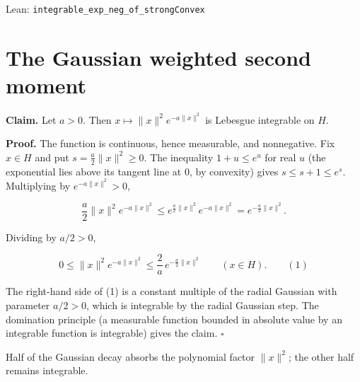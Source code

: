 \documentclass[11pt,a4paper]{article}
\begin{document}
\begin{leanbox}{Lean: \texttt{integrable\_\allowbreak{}exp\_\allowbreak{}neg\_\allowbreak{}of\_\allowbreak{}strongConvex}}
\begin{enumerate}
\end{enumerate}
\end{leanbox}

\section{\texorpdfstring{The Gaussian weighted second moment}{The Gaussian weighted second moment}}


\textbf{Claim.} Let \(a>0\). Then \(x\mapsto\|x\|^2e^{-a\|x\|^2}\) is Lebesgue integrable on \(H\).




\textbf{Proof.} The function is continuous, hence measurable, and nonnegative. Fix \(x\in H\) and put \(s=\frac a2\|x\|^2\ge0\). The inequality \(1+u\le e^u\) for real \(u\) (the exponential lies above its tangent line at \(0\), by convexity) gives \(s\le s+1\le e^{s}\). Multiplying by \(e^{-a\|x\|^2}>0\),


\[\frac a2\|x\|^2e^{-a\|x\|^2}\le e^{\frac a2\|x\|^2}e^{-a\|x\|^2}=e^{-\frac a2\|x\|^2}.\]


Dividing by \(a/2>0\),


\[0\le\|x\|^2e^{-a\|x\|^2}\le\frac2a\,e^{-\frac a2\|x\|^2}\qquad(x\in H).\qquad(1)\]


The right-hand side of (1) is a constant multiple of the radial Gaussian with parameter \(a/2>0\), which is integrable by the radial Gaussian step. The domination principle (a measurable function bounded in absolute value by an integrable function is integrable) gives the claim. \(\square\)




Half of the Gaussian decay absorbs the polynomial factor \(\|x\|^2\); the other half remains integrable.
\end{document}

